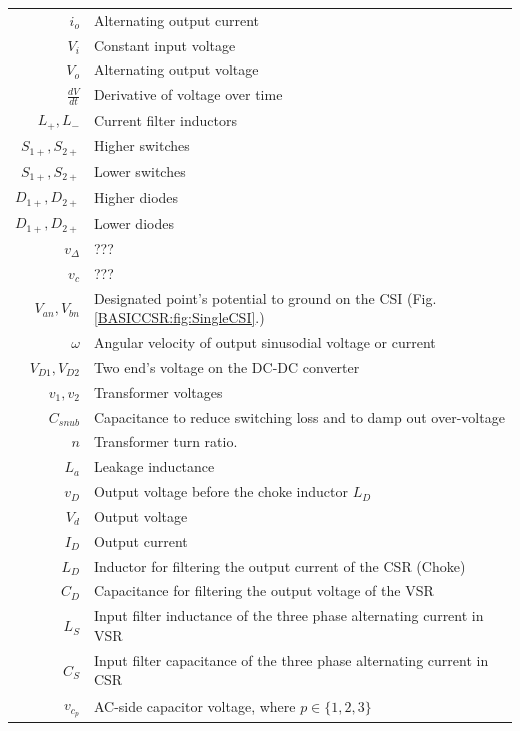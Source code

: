 \begin{tabularx}{\textwidth}{r|l}
	$i_o$															& Alternating output current\\
	$V_i$															& Constant input voltage\\
	$V_o$															& Alternating output voltage\\
	$\frac{dV}{dt}$										& Derivative of voltage over time\\
	$L_+,L_-$													& Current filter inductors\\
	$S_{1+},S_{2+}$										& Higher switches\\
	$S_{1+},S_{2+}$										& Lower switches\\
	$D_{1+},D_{2+}$										& Higher diodes\\
	$D_{1+},D_{2+}$										& Lower diodes\\
	$v_\Delta$												& ???\\
	$v_c$															& ???\\
	$V_{an},V_{bn}$  									& Designated point's potential to ground on the CSI (Fig.\ref{BASICCSR:fig:SingleCSI}.)\\
	$\omega$													& Angular velocity of output sinusodial voltage or current\\
	$V_{D1},V_{D2}$ 									& Two end's voltage on the DC-DC converter\\
	$v_1,v_2$                         & Transformer voltages\\
	$C_{snub}$ 												& Capacitance to reduce switching loss and to damp out over-voltage\\
	$n$ 															& Transformer turn ratio.\\
	$L_a$															& Leakage inductance\\
	$v_D$															& Output voltage before the choke inductor $L_D$\\
	$V_d$															& Output voltage\\
	$I_D$															& Output current\\
	$L_D$															& Inductor for filtering the output current of the CSR (Choke)\\ 
	$C_D$															& Capacitance for filtering the output voltage of the VSR\\ 
	$L_S$															& Input filter inductance of the three phase alternating current in VSR\\
	$C_S$															& Input filter capacitance of the three phase alternating current in CSR\\
	$v_{c_p}$													& AC-side capacitor voltage, where $p\in\{1,2,3\}$\\

\end{tabularx}

